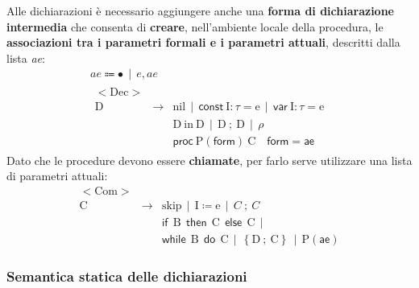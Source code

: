 \documentclass[a4paper]{article}
\begin{document}
	\noindent
	Alle dichiarazioni è necessario aggiungere anche una \textbf{forma di dichiarazione intermedia} che consenta di \textbf{creare}, nell'ambiente locale della procedura, le \textbf{associazioni tra i parametri formali e i parametri attuali}, descritti dalla lista \emph{ae}:
	\begin{gather*}
		ae \Coloneq \bullet \:\: | \:\: e, ae \\
		\begin{array}{rll}
			\mathrm{<Dec>} & & \\
			\mathrm{D} & \rightarrow & \mathrm{nil} \:\: | \:\: \textsf{const} \: \mathrm{I}:\tau = \mathrm{e} \:\: | \:\: \textsf{var} \: \mathrm{I} : \tau = \mathrm{e} \\
			&& \mathrm{D} \: \mathrm{in} \: \mathrm{D} \:\: | \:\: \mathrm{D} \: ; \: \mathrm{D} \:\: | \:\: \rho \\
			&& \textsf{proc} \: \mathrm{P(\textsf{form})} \: \mathrm{C} \hspace{1em} \textsf{form} = \textsf{ae}
		\end{array}
	\end{gather*}
	Dato che le procedure devono essere \textbf{chiamate}, per farlo serve utilizzare una lista di parametri attuali:
	\begin{equation*}
		\begin{array}{rll}
			\mathrm{<Com>} & & \\
			\mathrm{C} & \rightarrow & \mathrm{skip} \:\: | \:\: \mathrm{I} \coloneq \mathrm{e} \:\: | \:\: C \: ; \: C \:\: \\
			&& \textsf{if} \:\: \mathrm{B} \:\: \textsf{then} \:\: \mathrm{C} \:\: \textsf{else} \:\: \mathrm{C} \:\: | \\
			&& \textsf{while} \:\: \mathrm{B} \:\: \textsf{do} \:\: \mathrm{C} \:\: | \:\: \left\{\mathrm{D \: ; \: \mathrm{C}}\right\} \:\: | \:\: \mathrm{P(\textsf{ae})}
		\end{array}
	\end{equation*}\newpage
	
	\subsubsection{Semantica statica delle dichiarazioni}
	
\end{document}
